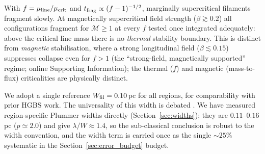 \documentclass[usenatbib,twoside,twocolumn]{mnras}
\begin{document}
With $f=\mu_{\rm line}/\mu_{\rm crit}$ and $t_{\rm frag}\propto(f-1)^{-1/2}$, marginally supercritical filaments fragment slowly. At magnetically supercritical field strength ($\beta\gtrsim0.2$) all configurations fragment for $\mathcal{M}\geq1$ at every $f$ tested once integrated adequately: above the critical line mass there is no \emph{thermal} stability boundary. This is distinct from \emph{magnetic} stabilisation, where a strong longitudinal field ($\beta\lesssim0.15$) suppresses collapse even for $f>1$ (the ``strong-field, magnetically supported'' regime; online Supporting Information); the thermal ($f$) and magnetic (mass-to-flux) criticalities are physically distinct.

We adopt a single reference $W_{\rm fil}=0.10$\,pc for all regions, for comparability with prior HGBS work. The universality of this width is debated \citep{Panopoulou2017,Panopoulou2022}. We have measured region-specific Plummer widths directly (Section~\ref{sec:widths}); they are $0.11$--$0.16$\,pc ($p\simeq2.0$) and give $\lambda/W\approx1.4$, so the sub-classical conclusion is robust to the width convention, and the width term is carried once as the single $\sim25\%$ systematic in the Section~\ref{sec:error_budget} budget.
\end{document}

